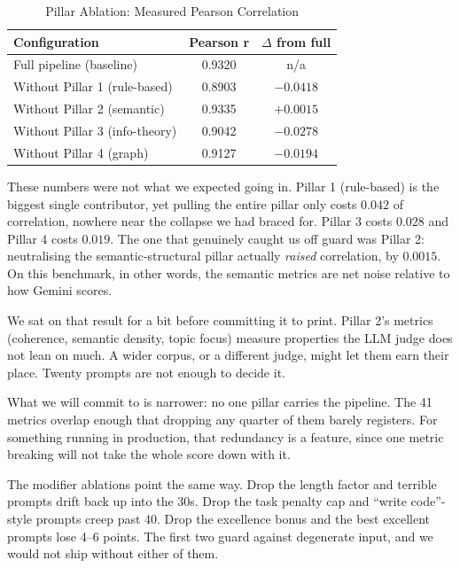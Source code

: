 \documentclass[conference]{IEEEtran}
\begin{document}
\begin{table}[t]
\centering
\caption{Pillar Ablation: Measured Pearson Correlation}
\label{tab:ablation}
\begin{tabular}{lcc}
\toprule
\textbf{Configuration} & \textbf{Pearson r} & \textbf{$\Delta$ from full} \\
\midrule
Full pipeline (baseline)        & 0.9320  & n/a     \\
Without Pillar 1 (rule-based)   & 0.8903  & $-0.0418$ \\
Without Pillar 2 (semantic)     & 0.9335  & $+0.0015$ \\
Without Pillar 3 (info-theory)  & 0.9042  & $-0.0278$ \\
Without Pillar 4 (graph)        & 0.9127  & $-0.0194$ \\
\bottomrule
\end{tabular}
\end{table}

These numbers were not what we expected going in. Pillar 1 (rule-based) is the biggest single contributor, yet pulling the entire pillar only costs $0.042$ of correlation, nowhere near the collapse we had braced for. Pillar 3 costs $0.028$ and Pillar 4 costs $0.019$. The one that genuinely caught us off guard was Pillar 2: neutralising the semantic-structural pillar actually \emph{raised} correlation, by $0.0015$. On this benchmark, in other words, the semantic metrics are net noise relative to how Gemini scores.

We sat on that result for a bit before committing it to print. Pillar 2's metrics (coherence, semantic density, topic focus) measure properties the LLM judge does not lean on much. A wider corpus, or a different judge, might let them earn their place. Twenty prompts are not enough to decide it.

What we will commit to is narrower: no one pillar carries the pipeline. The 41 metrics overlap enough that dropping any quarter of them barely registers. For something running in production, that redundancy is a feature, since one metric breaking will not take the whole score down with it.

The modifier ablations point the same way. Drop the length factor and terrible prompts drift back up into the 30s. Drop the task penalty cap and ``write code''-style prompts creep past 40. Drop the excellence bonus and the best excellent prompts lose 4--6 points. The first two guard against degenerate input, and we would not ship without either of them.
\end{document}
